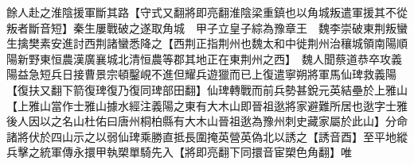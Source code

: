餘人赴之淮陰援軍斷其路【守式又翻將即亮翻淮陰梁重鎮也以角城叛遣軍援其不從叛者斷音短】秦生屢戰破之遂取角城　甲子立皇子綜為豫章王　魏李崇破東荆叛蠻生擒樊素安進討西荆諸蠻悉降之【西荆正指荆州也魏太和中徙荆州治穰城領南陽順陽新野東恒農漢廣襄城北清恒農等郡其地正在東荆州之西】　魏人聞蔡道恭卒攻義陽益急短兵日接曹景宗頓鑿峴不進但耀兵遊獵而已上復遣寧朔將軍馬仙琕救義陽【復扶又翻下箭復琕復乃復同琕部田翻】仙琕轉戰而前兵勢甚銳元英結壘於上雅山【上雅山當作士雅山據水經注義陽之東有大木山即晉祖逖將家避難所居也逖字士雅後人因以之名山杜佑曰唐州桐柏縣有大木山晉祖逖為豫州刺史藏家屬於此山】分命諸將伏於四山示之以弱仙琕乘勝直抵長圍掩英營英偽北以誘之【誘音酉】至平地縱兵擊之統軍傳永擐甲執槊單騎先入【將即亮翻下同擐音宦槊色角翻】唯